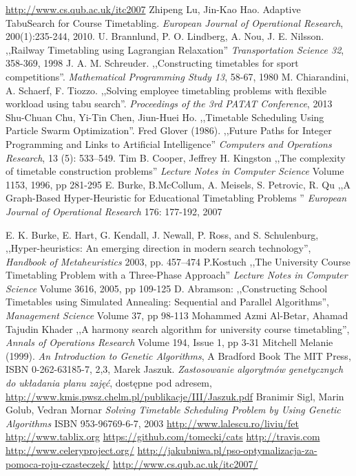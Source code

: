 \documentclass[11pt]{report}
\begin{document}
\begin{thebibliography}{2}
 \url{http://www.cs.qub.ac.uk/itc2007}
 Zhipeng Lu, Jin-Kao Hao. Adaptive TabuSearch for Course Timetabling.  \emph{European Journal of Operational Research}, 200(1):235-244, 2010.
 U. Brannlund, P. O. Lindberg, A. Nou, J. E. Nilsson. ,,Railway Timetabling using Lagrangian Relaxation'' \emph{Transportation Science 32}, 358-369, 1998
 J. A. M. Schreuder. ,,Constructing timetables for sport competitions''. \emph{Mathematical Programming Study 13}, 58-67, 1980
 M. Chiarandini, A. Schaerf, F. Tiozzo. ,,Solving employee timetabling problems with flexible workload using tabu search''. \emph{Proceedings of the 3rd PATAT Conference}, 2013
 Shu-Chuan Chu, Yi-Tin Chen, Jiun-Huei Ho. ,,Timetable Scheduling Using Particle Swarm Optimization''. 
 Fred Glover (1986). ,,Future Paths for Integer Programming and Links to Artificial Intelligence'' \emph{Computers and Operations Research}, 13 (5): 533–549.
 Tim B. Cooper, Jeffrey H. Kingston ,,The complexity of timetable construction problems''  \emph{Lecture Notes in Computer Science} Volume 1153, 1996, pp 281-295 
  E. Burke, B.McCollum, A. Meisels, S. Petrovic, R. Qu ,,A Graph-Based Hyper-Heuristic for Educational Timetabling Problems '' \emph{European Journal of Operational Research} 176: 177-192, 2007

 E. K. Burke, E. Hart, G. Kendall, J. Newall, P. Ross, and S. Schulenburg, ,,Hyper-heuristics: An emerging direction in modern search technology'', \emph{Handbook of Metaheuristics } 2003, pp. 457–474
 P.Kostuch ,,The University Course Timetabling Problem with a Three-Phase Approach'' \emph{
Lecture Notes in Computer Science} Volume 3616, 2005, pp 109-125
 D. Abramson: ,,Constructing School Timetables using Simulated Annealing: Sequential and Parallel Algorithms'', \emph{Management Science} Volume 37, pp 98-113
  Mohammed Azmi Al-Betar, Ahamad Tajudin Khader ,,A harmony search algorithm for university course timetabling'',  
\emph{Annals of Operations Research} Volume 194, Issue 1, pp 3-31 
 Mitchell Melanie (1999). \emph{An Introduction to Genetic Algorithms}, A Bradford Book The MIT Press, ISBN 0-262-63185-7, 2,3,
 Marek Jaszuk. \emph{Zastosowanie algorytmów genetycznych do układania planu zajęć}, dostępne pod adresem, \url{http://www.kmis.pwsz.chelm.pl/publikacje/III/Jaszuk.pdf}
 Branimir Sigl, Marin Golub, Vedran Mornar \emph{Solving Timetable Scheduling Problem by Using Genetic Algorithms} ISBN 953-96769-6-7, 2003
 \url{http://www.lalescu.ro/liviu/fet}
 \url{http://www.tablix.org}
 \url{https://github.com/tomecki/cats}
 \url{http://travis.com}
 \url{http://www.celeryproject.org/}
 \url{http://jakubniwa.pl/pso-optymalizacja-za-pomoca-roju-czasteczek/}
 \url{http://www.cs.qub.ac.uk/itc2007/}
\end{thebibliography}
\end{document}
